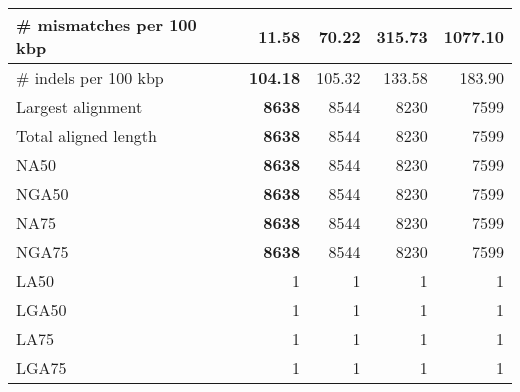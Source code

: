 \documentclass[12pt,a4paper]{article}
\begin{document}
\begin{table}[ht]
\begin{center}
\begin{tabular}{|l*{4}{|r}|}
\# mismatches per 100 kbp & {\bf 11.58} & 70.22 & 315.73 & 1077.10 \\ \hline
\# indels per 100 kbp & {\bf 104.18} & 105.32 & 133.58 & 183.90 \\ \hline
Largest alignment & {\bf 8638} & 8544 & 8230 & 7599 \\ \hline
Total aligned length & {\bf 8638} & 8544 & 8230 & 7599 \\ \hline
NA50 & {\bf 8638} & 8544 & 8230 & 7599 \\ \hline
NGA50 & {\bf 8638} & 8544 & 8230 & 7599 \\ \hline
NA75 & {\bf 8638} & 8544 & 8230 & 7599 \\ \hline
NGA75 & {\bf 8638} & 8544 & 8230 & 7599 \\ \hline
LA50 & 1 & 1 & 1 & 1 \\ \hline
LGA50 & 1 & 1 & 1 & 1 \\ \hline
LA75 & 1 & 1 & 1 & 1 \\ \hline
LGA75 & 1 & 1 & 1 & 1 \\ \hline
\end{tabular}
\end{center}
\end{table}
\end{document}
